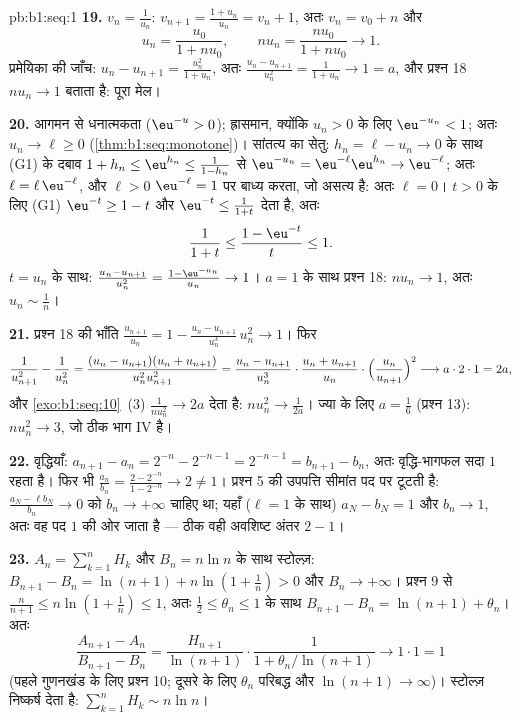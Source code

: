 \begin{solution}{pb:b1:seq:1}
\textbf{19.} $v_n = \frac{1}{u_n}$: $v_{n+1} = \frac{1 + u_n}{u_n} = v_n +
1$, अतः $v_n = v_0 + n$ और
\[
u_n = \frac{u_0}{1 + n u_0} , \qquad
n u_n = \frac{n u_0}{1 + n u_0} \longrightarrow 1 .
\]
प्रमेयिका की जाँच: $u_n - u_{n+1} = \frac{u_n^2}{1 + u_n}$, अतः $\frac{u_n -
u_{n+1}}{u_n^2} = \frac{1}{1 + u_n} \to 1 = a$, और प्रश्न 18 $n u_n \to 1$
बताता है: पूरा मेल।

\textbf{20.} आगमन से धनात्मकता ($\eu^{-u} > 0$); ह्रासमान, क्योंकि $u_n > 0$
के लिए $\eu^{-u_n} < 1$; अतः $u_n \to \ell \geq 0$
(\cref{thm:b1:seq:monotone})। सांतत्य का सेतु: $h_n = \ell - u_n \to 0$ के
साथ (G1) के दबाव $1 + h_n \leq \eu^{h_n} \leq \frac{1}{1 - h_n}$ से
$\eu^{-u_n} = \eu^{-\ell} \eu^{h_n} \to \eu^{-\ell}$; अतः $\ell = \ell\,
\eu^{-\ell}$, और $\ell > 0$ $\eu^{-\ell} = 1$ पर बाध्य करता, जो असत्य है:
अतः $\ell = 0$। $t > 0$ के लिए (G1) $\eu^{-t} \geq 1 - t$ और $\eu^{-t} \leq
\frac{1}{1 + t}$ देता है, अतः
\[
\frac{1}{1 + t} \leq \frac{1 - \eu^{-t}}{t} \leq 1 .
\]
$t = u_n$ के साथ: $\frac{u_n - u_{n+1}}{u_n^2} = \frac{1 - \eu^{-u_n}}{u_n}
\to 1$। $a = 1$ के साथ प्रश्न 18: $n u_n \to 1$, अतः $u_n \sim \frac1n$।

\textbf{21.} प्रश्न 18 की भाँति $\frac{u_{n+1}}{u_n} = 1 - \frac{u_n -
u_{n+1}}{u_n^3}\,u_n^2 \to 1$। फिर
\[
\frac{1}{u_{n+1}^2} - \frac{1}{u_n^2}
= \frac{(u_n - u_{n+1})(u_n + u_{n+1})}{u_n^2 u_{n+1}^2}
= \frac{u_n - u_{n+1}}{u_n^3}\cdot
\frac{u_n + u_{n+1}}{u_n}\cdot
\Bigl(\frac{u_n}{u_{n+1}}\Bigr)^2
\longrightarrow a \cdot 2 \cdot 1 = 2a ,
\]
और \cref{exo:b1:seq:10}~(3) $\frac{1}{n u_n^2} \to 2a$ देता है: $n u_n^2 \to
\frac{1}{2a}$। ज्या के लिए $a = \frac16$ (प्रश्न 13): $n u_n^2 \to 3$, जो
ठीक भाग IV है।

\textbf{22.} वृद्धियाँ: $a_{n+1} - a_n = 2^{-n} - 2^{-n-1} = 2^{-n-1} =
b_{n+1} - b_n$, अतः वृद्धि-भागफल सदा $1$ रहता है। फिर भी $\frac{a_n}{b_n} =
\frac{2 - 2^{-n}}{1 - 2^{-n}} \to 2 \neq 1$। प्रश्न 5 की उपपत्ति सीमांत पद
पर टूटती है: $\frac{a_N - \ell b_N}{b_n} \to 0$ को $b_n \to +\infty$ चाहिए
था; यहाँ ($\ell = 1$ के साथ) $a_N - b_N = 1$ और $b_n \to 1$, अतः वह पद $1$
की ओर जाता है --- ठीक वही अवशिष्ट अंतर $2 - 1$।

\textbf{23.} $A_n = \sum_{k=1}^n H_k$ और $B_n = n\ln n$ के साथ स्टोल्ज़:
$B_{n+1} - B_n = \ln(n+1) + n\ln(1 + \frac1n) > 0$ और $B_n \to +\infty$।
प्रश्न 9 से $\frac{n}{n+1} \leq n\ln(1 + \frac1n) \leq 1$, अतः $\frac12 \leq
\theta_n \leq 1$ के साथ $B_{n+1} - B_n = \ln(n+1) + \theta_n$। अतः
\[
\frac{A_{n+1} - A_n}{B_{n+1} - B_n}
= \frac{H_{n+1}}{\ln(n+1)}\cdot
\frac{1}{1 + \theta_n/\ln(n+1)} \longrightarrow 1 \cdot 1 = 1
\]
(पहले गुणनखंड के लिए प्रश्न 10; दूसरे के लिए $\theta_n$ परिबद्ध और $\ln(n+1)
\to \infty$)। स्टोल्ज़ निष्कर्ष देता है: $\sum_{k=1}^n H_k \sim n\ln n$।


\end{solution}
